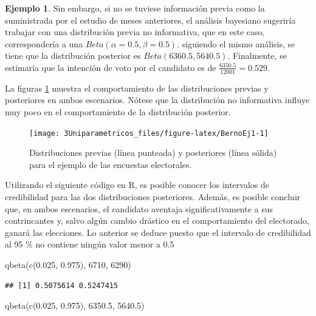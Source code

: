 \documentclass[
  10pt,
  spanish,
]{book}
\newenvironment{Shaded}{\begin{snugshade}}{\end{snugshade}}
\newcommand{\DecValTok}[1]{\textcolor[rgb]{0.00,0.00,0.81}{#1}}
\newcommand{\FloatTok}[1]{\textcolor[rgb]{0.00,0.00,0.81}{#1}}
\newcommand{\FunctionTok}[1]{\textcolor[rgb]{0.00,0.00,0.00}{#1}}
\newcommand{\NormalTok}[1]{#1}
\theoremstyle{definition}
\theoremstyle{definition}
\newtheorem{example}{Ejemplo}[chapter]
\theoremstyle{definition}
\theoremstyle{definition}
\theoremstyle{remark}
\begin{document}
\begin{example}
Sin embargo, si no se tuviese información previa como la suministrada por el estudio de meses anteriores, el análisis bayesiano sugeriría trabajar con una distribución previa no informativa, que en este caso, correspondería a una \(Beta(\alpha=0.5, \beta=0.5)\). siguiendo el mismo análisis, se tiene que la distribución posterior es \(Beta(6360.5, 5640.5)\). Finalmente, se estimaría que la intención de voto por el candidato es de \(\frac{6350.5}{12001}=0.529\).

La figuras \ref{fig:BernoEj1} muestra el comportamiento de las distribuciones previas y posteriores en ambos escenarios. Nótese que la distribución no informativa influye muy poco en el comportamiento de la distribución posterior.
\end{example}

\begin{figure}

{\centering \texttt{[image: 3Uniparametricos\_files/figure-latex/BernoEj1-1]} 

}

\caption{Distribuciones previas (línea punteada) y posteriores (línea sólida) para el ejemplo de las encuestas electorales.}\label{fig:BernoEj1}
\end{figure}

Utilizando el siguiente código en R, es posible conocer los intervalos
de credibilidad para las dos distribuciones posteriores. Además, es
posible concluir que, en ambos escenarios, el candidato aventaja
significativamente a sus contrincantes y, salvo algún cambio drástico en
el comportamiento del electorado, ganará las elecciones. Lo anterior se
deduce puesto que el intervalo de credibilidad al 95 \% no contiene
ningún valor menor a 0.5

\begin{Shaded}
\begin{Highlighting}[]
\FunctionTok{qbeta}\NormalTok{(}\FunctionTok{c}\NormalTok{(}\FloatTok{0.025}\NormalTok{, }\FloatTok{0.975}\NormalTok{), }\DecValTok{6710}\NormalTok{, }\DecValTok{6290}\NormalTok{)}
\end{Highlighting}
\end{Shaded}

\begin{verbatim}
## [1] 0.5075614 0.5247415
\end{verbatim}

\begin{Shaded}
\begin{Highlighting}[]
\FunctionTok{qbeta}\NormalTok{(}\FunctionTok{c}\NormalTok{(}\FloatTok{0.025}\NormalTok{, }\FloatTok{0.975}\NormalTok{), }\FloatTok{6350.5}\NormalTok{, }\FloatTok{5640.5}\NormalTok{)}
\end{Highlighting}
\end{Shaded}
\end{document}

